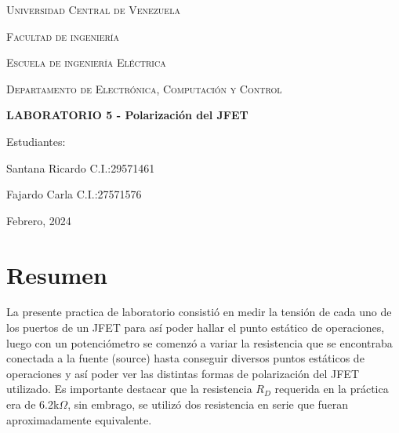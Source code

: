 \documentclass[12pt, a4paper]{article}
\begin{document}
    \begin{titlepage}
        \centering
        {\scshape\Large Universidad Central de Venezuela \par}
        {\scshape\Large Facultad de ingeniería \par}
        {\scshape\Large Escuela de ingeniería Eléctrica \par}
        {\scshape\Large Departamento de Electrónica, Computación y Control \par}

        \vspace{6cm}
        {\Large\bfseries LABORATORIO 5 - Polarización del JFET\par}
        \vspace{6cm}

        \vfill
        \begin{flushright}
            Estudiantes:\par
            Santana Ricardo C.I.:29571461 \par
            Fajardo Carla C.I.:27571576
            \vspace{1cm}  
        \end{flushright}
        \vfill
        {\large Febrero, 2024 \par}
    \end{titlepage}

    \tableofcontents

    \newpage

    \section{Resumen}

    La presente practica de laboratorio consistió en medir la tensión de cada uno de los puertos de un JFET para así poder hallar el punto estático de operaciones, luego con un potenciómetro se comenzó a variar la resistencia que se encontraba conectada a la fuente (source) hasta conseguir diversos puntos estáticos de operaciones y así poder ver las distintas formas de polarización del JFET utilizado. Es importante destacar que la resistencia $R_D$ requerida en la práctica era de 6.2k$\Omega$, sin embrago, se utilizó dos resistencia en serie que fueran aproximadamente equivalente. 
    
\end{document}
